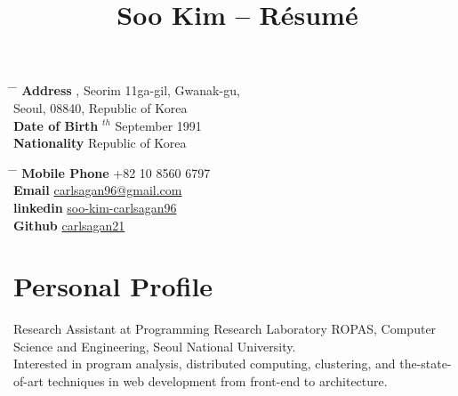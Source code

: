 \documentclass[10pt]{article} %
\begin{document}

\title{Soo Kim -- Résumé} %


\parbox{0.5\textwidth}{ %
\begin{tabbing} %
\hspace{3cm} \= \hspace{4cm} \= \kill %
{\bf Address} , Seorim 11ga-gil, Gwanak-gu,\\ %
\> Seoul, 08840, Republic of Korea \\ %
{\bf Date of Birth} $^{th}$ September 1991 \\ %
{\bf Nationality} \> Republic of Korea %
\end{tabbing}
}
\hfill %
\parbox{0.5\textwidth}{ %
\begin{tabbing} %
\hspace{3cm} \= \hspace{4cm} \= \kill %
{\bf Mobile Phone} \> +82 10 8560 6797 \\ %
{\bf Email} \> \href{mailto:carlsagan96@gmail.com}{carlsagan96@gmail.com} \\ %
{\bf linkedin} \> \href{https://www.linkedin.com/in/soo-kim-carlsagan96/}{soo-kim-carlsagan96} \\
{\bf Github} \> \href{https://github.com/carlsagan21}{carlsagan21}
\end{tabbing}}


\section{Personal Profile}

Research Assistant at Programming Research Laboratory ROPAS, Computer Science and Engineering, Seoul National University.\\
Interested in program analysis, distributed computing, clustering, and the-state-of-art techniques in web development from front-end to architecture.
\end{document}
